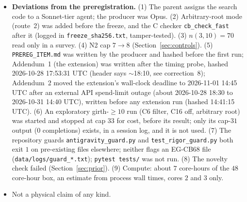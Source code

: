 \documentclass[10pt]{article}
\begin{document}
\begin{itemize}
\item \textbf{Deviations from the preregistration.} (1) The parent assigns the search code to a Sonnet-tier agent; the producer was Opus. (2) Arbitrary-root mode (route~2) was added before the freeze, and the C checker \texttt{cb\_check\_fast} after it (logged in \texttt{freeze\_sha256.txt}, tamper-tested). (3) $n(3,10)=70$ read only in a survey. (4) N2 cap $7\to8$ (Section~\ref{sec:controls}). (5) \texttt{PREREG\_ITEM.md} was written by the producer and hashed before the first run; Addendum~1 (the extension) was written after the timing probe, hashed 2026-10-28 17:53:31 UTC (header says $\sim$18:10, see correction~8); Addendum~2 moved the extension's wall-clock deadline to 2026-11-01 14:45 UTC after an external API spend-limit outage (about 2026-10-28 18:30 to 2026-10-31 14:40 UTC), written before any extension run (hashed 14:41:15 UTC). (6) An exploratory girth-$\ge10$ run (C6 filter, C16 off, arbitrary root) was started and stopped at cap $33$ for cost, before its result; only its cap-$31$ output ($0$ completions) exists, in a session log, and it is not used. (7) The repository guards \texttt{antigravity\_guard.py} and \texttt{test\_rigor\_guard.py} both exit $1$ on pre-existing files elsewhere; neither flags an EG-CB68 file (\texttt{data/logs/guard\_*.txt}); \texttt{pytest tests/} was not run. (8) The novelty check failed (Section~\ref{sec:prior}). (9) Compute: about $7$ core-hours of the $48$ core-hour box, an estimate from process wall times, cores $2$ and $3$ only.
\item Not a physical claim of any kind.
\end{itemize}

\end{document}
